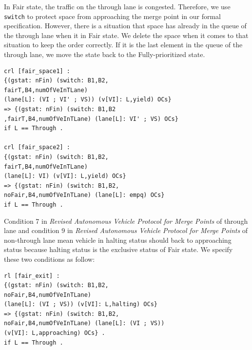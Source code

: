 \documentclass[10pt, conference, compsocconf]{IEEEtran}
\begin{document}
\noindent In Fair state, the traffic on the through lane is congested. 
Therefore, we use \verb!switch! to protect space from approaching the merge point in our formal specification.
However, there is a situation that space has already in the queue of the through lane when it in Fair state. 
We delete the space when it comes to that situation to keep the order correctly. 
If it is the last element in the queue of the through lane, we move the state back to the Fully-prioritized state.

\begin{footnotesize}
\begin{verbatim}
crl [fair_space1] :
{(gstat: nFin) (switch: B1,B2,
fairT,B4,numOfVeInTLane) 
(lane[L]: (VI ; VI' ; VS)) (v[VI]: L,yield) OCs} 
=> {(gstat: nFin) (switch: B1,B2
,fairT,B4,numOfVeInTLane) (lane[L]: VI' ; VS) OCs} 
if L == Through .

crl [fair_space2] : 
{(gstat: nFin) (switch: B1,B2,
fairT,B4,numOfVeInTLane) 
(lane[L]: VI) (v[VI]: L,yield) OCs} 
=> {(gstat: nFin) (switch: B1,B2,
noFair,B4,numOfVeInTLane) (lane[L]: empq) OCs} 
if L == Through .
\end{verbatim}
\end{footnotesize}

\noindent Condition 7 in \textit{Revised Autonomous Vehicle Protocol for Merge Points} of through lane and condition 9 in \textit{Revised Autonomous Vehicle Protocol for Merge Points} of non-through lane mean vehicle in halting status should back to approaching status because halting status is the exclusive status of Fair state.
We specify these two conditions as follow:

\begin{footnotesize}
\begin{verbatim}
rl [fair_exit] : 
{(gstat: nFin) (switch: B1,B2,
noFair,B4,numOfVeInTLane) 
(lane[L]: (VI ; VS)) (v[VI]: L,halting) OCs} 
=> {(gstat: nFin) (switch: B1,B2,
noFair,B4,numOfVeInTLane) (lane[L]: (VI ; VS)) 
(v[VI]: L,approaching) OCs} .
if L == Through .
\end{verbatim}
\end{footnotesize}












\end{document}
